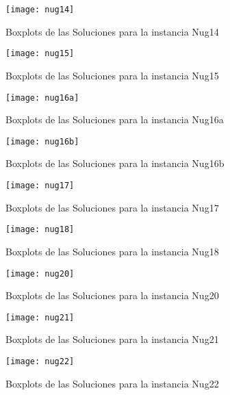\documentclass{ci5652}
\begin{document}
\begin{figure}[ht]
	\caption{Boxplots de las Soluciones para la instancia Nug14}
	\texttt{[image: nug14]}
    \centering
    \label{fig:boxplot_nug14}
\end{figure}

\begin{figure}[ht]
	\caption{Boxplots de las Soluciones para la instancia Nug15}
	\texttt{[image: nug15]}
    \centering
    \label{fig:boxplot_nug15}
\end{figure}

\begin{figure}[ht]
	\caption{Boxplots de las Soluciones para la instancia Nug16a}
	\texttt{[image: nug16a]}
    \centering
    \label{fig:boxplot_nug16a}
\end{figure}

\begin{figure}[ht]
	\caption{Boxplots de las Soluciones para la instancia Nug16b}
	\texttt{[image: nug16b]}
    \centering
    \label{fig:boxplot_nug16b}
\end{figure}

\begin{figure}[ht]
	\caption{Boxplots de las Soluciones para la instancia Nug17}
	\texttt{[image: nug17]}
    \centering
    \label{fig:boxplot_nug17}
\end{figure}

\begin{figure}[ht]
	\caption{Boxplots de las Soluciones para la instancia Nug18}
	\texttt{[image: nug18]}
    \centering
    \label{fig:boxplot_nug18}
\end{figure}

\begin{figure}[ht]
	\caption{Boxplots de las Soluciones para la instancia Nug20}
	\texttt{[image: nug20]}
    \centering
    \label{fig:boxplot_nug20}
\end{figure}

\begin{figure}[ht]
	\caption{Boxplots de las Soluciones para la instancia Nug21}
	\texttt{[image: nug21]}
    \centering
    \label{fig:boxplot_nug21}
\end{figure}

\begin{figure}[ht]
	\caption{Boxplots de las Soluciones para la instancia Nug22}
	\texttt{[image: nug22]}
    \centering
    \label{fig:boxplot_nug22}
\end{figure}
\end{document}
